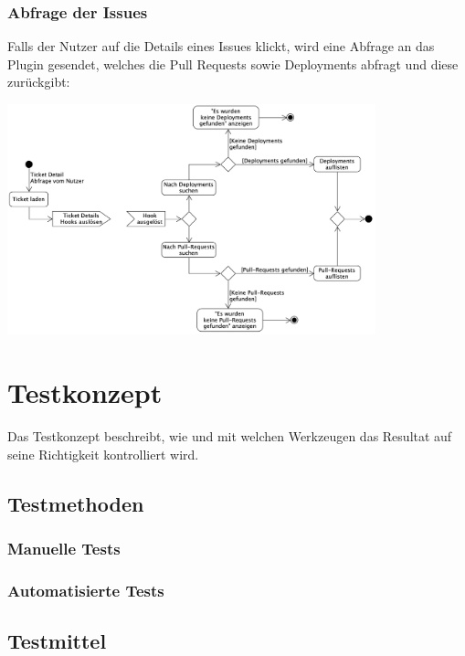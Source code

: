 \begin{minipage}{\textwidth}
  \subsubsection{Abfrage der Issues}
  Falls der Nutzer auf die Details eines Issues klickt, wird eine Abfrage an das Plugin gesendet, welches die Pull Requests sowie
  Deployments abfragt und diese zurückgibt: \newline
  \begin{center}
    \includegraphics[width=0.8\textwidth]{images/activity/issues-view.png}
    \label{fig:activity_issues}
  \end{center}

\end{minipage}

\section{Testkonzept}
Das Testkonzept beschreibt, wie und mit welchen Werkzeugen das Resultat auf seine Richtigkeit kontrolliert wird.

\subsection{Testmethoden}
\subsubsection{Manuelle Tests}
\subsubsection{Automatisierte Tests}

\subsection{Testmittel}
